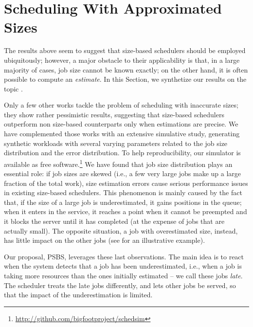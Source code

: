 \documentclass[11pt,oneside,english]{amsart}
\numberwithin{equation}{section}
\numberwithin{figure}{section}
\theoremstyle{definition}
\theoremstyle{plain}
\begin{document}
\section{\label{sec:Scheduling-With-Uncertain}Scheduling With Approximated
Sizes}

The results above seem to suggest that size-based schedulers should
be employed ubiquitously; however, a major obstacle to their applicability
is that, in a large majority of cases, job size cannot be known exactly;
on the other hand, it is often possible to compute an \emph{estimate}. 
In this Section, we synthetize our results
on the topic \cite{dell2014revisiting,DellAmico2014}.\begin{comment}
 For example, a file server can base its estimation on file size \cite{schroeder2006web},
and a data processing job can use the size of its input. In several
cases, literature several ways of predicting job sizes that depend
on domain knowledge \cite{nsdi12-c,lipton1995query,query_perf,mascots12}.
\end{comment}


Only a few other works \cite{lu2004size,wierman2008scheduling} tackle
the problem of scheduling with inaccurate sizes; they show rather pessimistic
results, suggesting that size-based schedulers outperform non
size-based counterparts only when estimations are precise. We have
complemented those works with an extensive simulative study, generating
synthetic workloads with several varying parameters related to the job
size distribution and the error distribution. To help reproducibility,
our simulator is available as free software.\footnote{\url{http://github.com/bigfootproject/schedsim}}
We have found that job size distribution plays an essential role:
if job sizes are skewed (i.e., a few very large jobs make up a large
fraction of the total work), size estimation errors cause serious
performance issues in existing size-based schedulers. This phenomenon
is mainly caused by the fact that, if the size of a large job is 
underestimated, it gains positions in the queue; when it enters in 
the service, it reaches a point when it cannot be preempted and it blocks the server
until it has completed (at the expense of jobs that are actually small).
The opposite situation, a job with overestimated size, instead, has little
impact on the other jobs (see \cite{DellAmico2014} for an illustrative example).

Our proposal, PSBS, leverages these last observations. The main idea is
to react when the system detects that a job has been underestimated, 
i.e., when a job is taking more resources than the ones initially estimated --
we call these jobs \emph{late}. The scheduler treats the late jobs differently, 
and lets other jobs be served, so that the impact of the underestimation 
is limited.
\end{document}
